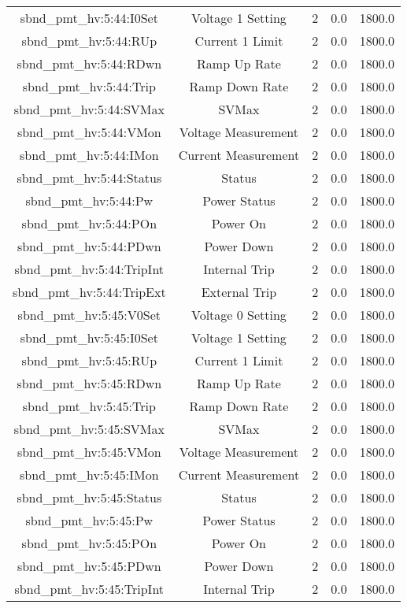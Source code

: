 \begin{table}[ptb]
\begin{tabular}{c | c c c c}
sbnd_pmt_hv:5:44:I0Set & Voltage 1 Setting & 2 & 0.0 & 1800.0\\ 
sbnd_pmt_hv:5:44:RUp & Current 1 Limit & 2 & 0.0 & 1800.0\\ 
sbnd_pmt_hv:5:44:RDwn & Ramp Up Rate & 2 & 0.0 & 1800.0\\ 
sbnd_pmt_hv:5:44:Trip & Ramp Down Rate & 2 & 0.0 & 1800.0\\ 
sbnd_pmt_hv:5:44:SVMax & SVMax & 2 & 0.0 & 1800.0\\ 
sbnd_pmt_hv:5:44:VMon & Voltage Measurement & 2 & 0.0 & 1800.0\\ 
sbnd_pmt_hv:5:44:IMon & Current Measurement & 2 & 0.0 & 1800.0\\ 
sbnd_pmt_hv:5:44:Status & Status & 2 & 0.0 & 1800.0\\ 
sbnd_pmt_hv:5:44:Pw & Power Status & 2 & 0.0 & 1800.0\\ 
sbnd_pmt_hv:5:44:POn & Power On & 2 & 0.0 & 1800.0\\ 
sbnd_pmt_hv:5:44:PDwn & Power Down & 2 & 0.0 & 1800.0\\ 
sbnd_pmt_hv:5:44:TripInt & Internal Trip & 2 & 0.0 & 1800.0\\ 
sbnd_pmt_hv:5:44:TripExt & External Trip & 2 & 0.0 & 1800.0\\ 
sbnd_pmt_hv:5:45:V0Set & Voltage 0 Setting & 2 & 0.0 & 1800.0\\ 
sbnd_pmt_hv:5:45:I0Set & Voltage 1 Setting & 2 & 0.0 & 1800.0\\ 
sbnd_pmt_hv:5:45:RUp & Current 1 Limit & 2 & 0.0 & 1800.0\\ 
sbnd_pmt_hv:5:45:RDwn & Ramp Up Rate & 2 & 0.0 & 1800.0\\ 
sbnd_pmt_hv:5:45:Trip & Ramp Down Rate & 2 & 0.0 & 1800.0\\ 
sbnd_pmt_hv:5:45:SVMax & SVMax & 2 & 0.0 & 1800.0\\ 
sbnd_pmt_hv:5:45:VMon & Voltage Measurement & 2 & 0.0 & 1800.0\\ 
sbnd_pmt_hv:5:45:IMon & Current Measurement & 2 & 0.0 & 1800.0\\ 
sbnd_pmt_hv:5:45:Status & Status & 2 & 0.0 & 1800.0\\ 
sbnd_pmt_hv:5:45:Pw & Power Status & 2 & 0.0 & 1800.0\\ 
sbnd_pmt_hv:5:45:POn & Power On & 2 & 0.0 & 1800.0\\ 
sbnd_pmt_hv:5:45:PDwn & Power Down & 2 & 0.0 & 1800.0\\ 
sbnd_pmt_hv:5:45:TripInt & Internal Trip & 2 & 0.0 & 1800.0\\ 

\end{tabular}
\end{table}
